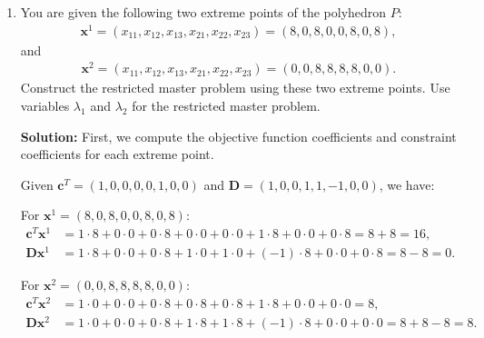 \documentclass[11pt]{article}
\newcommand{\mb}[1]{\ensuremath{\boldsymbol{#1}}}
\begin{document}
\begin{enumerate}
\begin{enumerate}
\textbf{Solution:} From the original problem, the objective function is $\max x_{11} + x_{22}$, and the complicating constraint is $x_{11} + x_{14} + x_{21} - x_{22} \leq 20$.

Since $\mb{x} = (x_{11}, x_{12}, x_{13}, x_{14}, x_{21}, x_{22}, x_{23}, x_{24})$, we have:
\begin{align*}
\mb{c}^T &= (1, 0, 0, 0, 0, 1, 0, 0), \\
\mb{D} &= (1, 0, 0, 1, 1, -1, 0, 0), \\
\mb{b} &= 20.
\end{align*}

\item You are given the following two extreme points of the polyhedron $P$: 
\begin{align*}
\mb{x}^1 = (x_{11},x_{12},x_{13},x_{21},x_{22},x_{23}) = (8, 0, 8, 0, 0, 8, 0, 8),
\end{align*}
and 
\begin{align*}
\mb{x}^2 = (x_{11},x_{12},x_{13},x_{21},x_{22},x_{23}) = (0,0,8, 8, 8, 8, 0,0).
\end{align*}
Construct the restricted master problem using these two extreme points. Use variables $\lambda_1$ and $\lambda_2$ for the restricted master problem.

\textbf{Solution:} First, we compute the objective function coefficients and constraint coefficients for each extreme point.

Given $\mb{c}^T = (1, 0, 0, 0, 0, 1, 0, 0)$ and $\mb{D} = (1, 0, 0, 1, 1, -1, 0, 0)$, we have:

For $\mb{x}^1 = (8, 0, 8, 0, 0, 8, 0, 8)$:
\begin{align*}
\mb{c}^T \mb{x}^1 &= 1 \cdot 8 + 0 \cdot 0 + 0 \cdot 8 + 0 \cdot 0 + 0 \cdot 0 + 1 \cdot 8 + 0 \cdot 0 + 0 \cdot 8 = 8 + 8 = 16, \\
\mb{D} \mb{x}^1 &= 1 \cdot 8 + 0 \cdot 0 + 0 \cdot 8 + 1 \cdot 0 + 1 \cdot 0 + (-1) \cdot 8 + 0 \cdot 0 + 0 \cdot 8 = 8 - 8 = 0.
\end{align*}

For $\mb{x}^2 = (0, 0, 8, 8, 8, 8, 0, 0)$:
\begin{align*}
\mb{c}^T \mb{x}^2 &= 1 \cdot 0 + 0 \cdot 0 + 0 \cdot 8 + 0 \cdot 8 + 0 \cdot 8 + 1 \cdot 8 + 0 \cdot 0 + 0 \cdot 0 = 8, \\
\mb{D} \mb{x}^2 &= 1 \cdot 0 + 0 \cdot 0 + 0 \cdot 8 + 1 \cdot 8 + 1 \cdot 8 + (-1) \cdot 8 + 0 \cdot 0 + 0 \cdot 0 = 8 + 8 - 8 = 8.
\end{align*}


\end{enumerate}
\end{enumerate}
\end{document}
